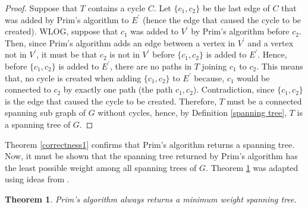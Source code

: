 \documentclass[12pt]{article}
\newtheorem{theorem}[definition]{Theorem}
\numberwithin{equation}{subsection}
\numberwithin{table}{subsection}
\numberwithin{algorithm}{subsection}
\begin{document}
\begin{proof}
Suppose that $T$ contains a cycle $C$. Let $\{c_1, c_2\}$ be the last edge of $C$ that was added by Prim's algorithm to $E^\prime$ (hence the edge that caused the cycle to be created). WLOG, suppose that $c_1$ was added to $V^\prime$ by Prim's algorithm before $c_2$. Then, since Prim's algorithm adds an edge between a vertex in $V^\prime$ and a vertex not in $V^\prime$, it must be that $c_2$ is not in $V^\prime$ before $\{c_1, c_2\}$ is added to $E^\prime$. Hence, before $\{c_1, c_2\}$ is added to $E^\prime$, there are no paths in $T$ joining $c_1$ to $c_2$. This means that, no cycle is created when adding $\{c_1, c_2\}$ to $E^\prime$ because, $c_1$ would be connected to $c_2$ by exactly one path (the path $c_1, c_2$). Contradiction, since $\{c_1, c_2\}$ is the edge that caused the cycle to be created. Therefore, $T$ must be a connected spanning sub graph of $G$ without cycles, hence, by Definition \ref{spanning tree}, $T$ is a spanning tree of $G$.
\end{proof}
Theorem \ref{correctness1} confirms that Prim's algorithm returns a spanning tree. Now, it must be shown that the spanning tree returned by Prim's algorithm has the least possible weight among all spanning trees of $G$. Theorem \ref{correctness2} was adapted using ideas from \cite{prim's_algorithm}.
\begin{theorem}
Prim's algorithm always returns a minimum weight spanning tree. {}
\label{correctness2}
\end{theorem}
\end{document}
